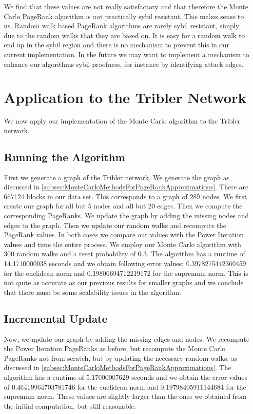\documentclass[twocolumn]{article}
\theoremstyle{definition}
\theoremstyle{theorem}
\begin{document}
\noindent We find that these values are not really satisfactory and that therefore the Monte Carlo PageRank algorithm is not practically sybil resistant. This makes sense to us. Random walk based PageRank algorithms are rarely sybil resistant, simply due to the random walks that they are based on. It is easy for a random walk to end up in the sybil region and there is no mechanism to prevent this in our current implementation. In the future we may want to implement a mechanism to enhance our algorithms sybil proofness, for instance by identifying attack edges. 
\section{Application to the Tribler Network}
\label{sec:ApplicationToTheTriblerNetwork}
We now apply our implementation of the Monte Carlo algorithm to the Tribler network.
\subsection{Running the Algorithm}
\label{subsec:RunningTheAlgorithm}
First we generate a graph of the Tribler network. We generate the graph as discussed in \ref{subsec:MonteCarloMethodsForPageRankApproximations}. There are 667124 blocks in our data set. This corresponds to a graph of 289 nodes. We first create our graph for all but 5 nodes and all but 20 edges. Then we compute the corresponding PageRanks. We update the graph by adding the missing nodes and edges to the graph. Then we update our random walks and recompute the PageRank values. In both cases we compare our values with the Power Iteration values and time the entire process. We employ our Monte Carlo algorithm with 300 random walks and a reset probability of 0.3. The algorithm has a runtime of 14.1710000038 seconds and we obtain following error values: 0.3978275442360459 for the euclidean norm and 0.19806694712219172 for the supremum norm. This is not quite as accurate as our previous results for smaller graphs and we conclude that there must be some scalability issues in the algorithm.

\subsection{Incremental Update}
\label{subsec:IncrementalUpdates}
Now, we update our graph by adding the missing edges and nodes. We recompute the Power Iteration PageRanks as before, but recompute the Monte Carlo PageRanks not from scratch, but by updating the necessary random walks, as discussed in \ref{subsec:MonteCarloMethodsForPageRankApproximations}. The algorithm has a runtime of 5.17000007629 seconds and we obtain the error values of 0.46419964703781746 for the euclidean norm and 0.19798405911144684 for the supremum norm. These values are slightly larger than the ones we obtained from the initial computation, but still reasonable. 
\end{document}
